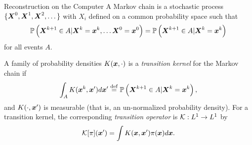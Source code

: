 \begin{chapter}{Reconstruction on the Computer}
A Markov chain is a stochastic process $\{\mbox{\boldmath$X$}^0, \mbox{\boldmath$X$}^1,\mbox{\boldmath$X$}^2,\dots\}$ with $X_i$ defined on a common probability space such that
\begin{equation} \label{eq:markovCondition}
  \mathbb P\left( \mbox{\boldmath$X$}^{k+1} \in A | \mbox{\boldmath$X$}^k= \mbox{\boldmath$x$}^k,\dots \mbox{\boldmath$X$}^0=\mbox{\boldmath$x$}^0\right) 
    = \mathbb P\left( \mbox{\boldmath$X$}^{k+1} \in A | \mbox{\boldmath$X$}^k= \mbox{\boldmath$x$}^k\right) 
\end{equation}
for all events $A$.  
  
%
A family of probability densities $K(\mbox{\boldmath$x$},\cdot)$ is a \emph{transition kernel} for the Markov chain if
\begin{equation}
  \int_A K(\mbox{\boldmath$x$}^k,\mbox{\boldmath$x$}') d\mbox{\boldmath$x$}'
    \stackrel{\rm def}{=} \mathbb P\left( \mbox{\boldmath$X$}^{k+1} \in A | \mbox{\boldmath$X$}^k= \mbox{\boldmath$x$}^k\right),
\end{equation}
and $K(\cdot , \mbox{\boldmath$x$}')$ is measurable (that is, an un-normalized probability density).
For a transition kernel, the corresponding \emph{transition operator} is $\mathcal K:L^1\to L^1$ by
\begin{equation}
  \mathcal K [\pi](\mbox{\boldmath$x$}') = \int K(\mbox{\boldmath$x$},\mbox{\boldmath$x$}') \pi(\mbox{\boldmath$x$})d\mbox{\boldmath$x$}.
\end{equation}


\end{chapter}
